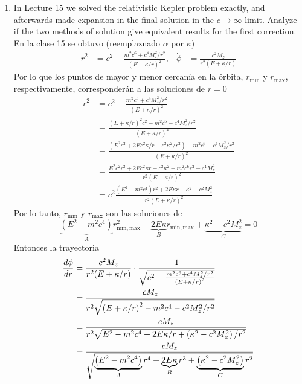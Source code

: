 \documentclass[]{article}
\numberwithin{equation}{section}
\begin{document}
\begin{enumerate}
	\item[b.] In Lecture 15 we solved the relativistic Kepler problem exactly, and afterwards made expansion in the final solution in the $c \to \infty$ limit. Analyze if the two methods of solution give equivalent results for the first correction.
	\resp En la clase 15 se obtuvo (reemplaznado $\alpha$ por $\kappa$)
	\begin{align}
		\dot{r}^2 &= c
		^2 - \frac{m^2 c^6 + c^4 M_z^2 / r^2}{\left(E + \kappa/r\right)^2} , & \dot{\phi} &= \frac{c^2 M_z}{r^2 (E + \kappa/r)}
	\end{align}
	Por lo que los puntos de mayor y menor cercanía en la órbita, $r_\mathrm{min}$ y $r_\mathrm{max}$, respectivamente, corresponderán a las soluciones de $\dot{r} = 0$
	\begin{align*}
		\dot{r}^2 &= c^2 - \frac{m^2 c^6 + c^4 M_z^2 / r^2}{\left(E + \kappa/r\right)^2}\\
		&= \frac{\left(E + \kappa/r\right)^2 c^2 - m^2 c^6 - c^4 M_z^2 / r^2}{\left(E + \kappa/r\right)^2}\\
		&= \frac{\left(E^2 c^2 + 2 E c^2 \kappa/r + c^2 \kappa^2/r^2\right) - m^2 c^6 - c^4 M_z^2 / r^2}{\left(E + \kappa/r\right)^2}\\
		&= \frac{E^2 c^2 r^2 + 2 E c^2 \kappa r + c^2 \kappa^2 - m^2 c^6 r^2 - c^4 M_z^2}{r^2 \left(E + \kappa/r\right)^2}\\
		&= c^2 \frac{\left(E^2 - m^2 c^4\right) r^2 + 2 E \kappa r + \kappa^2 - c^2 M_z^2}{r^2 \left(E + \kappa/r\right)^2}
	\end{align*}
	Por lo tanto, $r_\mathrm{min}$ y $r_\mathrm{max}$ son las soluciones de
	\begin{equation}
		\underbrace{\left(E^2 - m^2 c^4\right)}_{A} r_\mathrm{min,max}^2 + \underbrace{2 E \kappa}_{B} r_\mathrm{min,max} + \underbrace{\kappa^2 - c^2 M_z^2}_{C} = 0
	\end{equation}
	Entonces la trayectoria
	\begin{align}
		\td{\phi}{r} &= \frac{c^2 M_z}{r^2 (E + \kappa/r)} \cdot \frac{1}{\sqrt{c^2 - \frac{m^2 c^6 + c^4 M_z^2 / r^2}{\left(E + \kappa/r\right)^2} }}\nonumber\\
		&= \frac{c M_z}{r^2 \sqrt{\left(E + \kappa/r\right)^2 - m^2 c^4 - c^2 M_z^2 / r^2 }}\nonumber\\
		&= \frac{c M_z}{r^2 \sqrt{E^2 - m^2 c^4 + 2E\kappa/r + \left(\kappa^2 - c^2 M_z^2\right) / r^2 }}\nonumber\\
		&= \frac{c M_z}{\sqrt{\underbrace{\left(E^2 - m^2 c^4\right)}_{A} r^4 + \underbrace{2 E \kappa}_{B} r^3 + \underbrace{\left(\kappa^2 - c^2 M_z^2\right)}_{C} r^2 }}

\end{align}
\end{enumerate}
\end{document}
